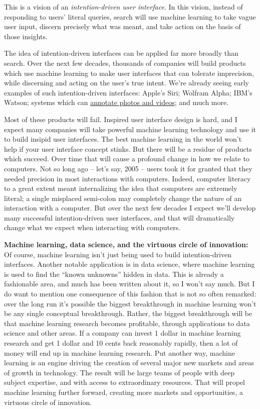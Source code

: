 \documentclass[a4paper,twoside,10pt]{book}
\begin{document}
This is a vision of an \textit{intention-driven user interface}. In this vision, instead of responding to users' literal queries, search will use machine learning to take vague user input, discern precisely what was meant, and take action on the basis of those insights.

The idea of intention-driven interfaces can be applied far more broadly than search. Over the next few decades, thousands of companies will build products which use machine learning to make user interfaces that can tolerate imprecision, while discerning and acting on the user's true intent. We're already seeing early examples of such intention-driven interfaces: Apple's Siri; Wolfram Alpha; IBM's Watson; systems which can \href{http://arxiv.org/abs/1411.4555}{annotate photos and videos}; and much more.

Most of these products will fail. Inspired user interface design is hard, and I expect many companies will take powerful machine learning technology and use it to build insipid user interfaces. The best machine learning in the world won't help if your user interface concept stinks. But there will be a residue of products which succeed. Over time that will cause a profound change in how we relate to computers. Not so long ago -- let's say, 2005 -- users took it for granted that they needed precision in most interactions with computers. Indeed, computer literacy to a great extent meant internalizing the idea that computers are extremely literal; a single misplaced semi-colon may completely change the nature of an interaction with a computer. But over the next few decades I expect we'll develop many successful intention-driven user interfaces, and that will dramatically change what we expect when interacting with computers.

\textbf{Machine learning, data science, and the virtuous circle of innovation:} Of course, machine learning isn't just being used to build intention-driven interfaces. Another notable application is in data science, where machine learning is used to find the ``known unknowns'' hidden in data. This is already a fashionable area, and much has been written about it, so I won't say much. But I do want to mention one consequence of this fashion that is not so often remarked: over the long run it's possible the biggest breakthrough in machine learning won't be any single conceptual breakthrough. Rather, the biggest breakthrough will be that machine learning research becomes profitable, through applications to data science and other areas. If a company can invest 1 dollar in machine learning research and get 1 dollar and 10 cents back reasonably rapidly, then a lot of money will end up in machine learning research. Put another way, machine learning is an engine driving the creation of several major new markets and areas of growth in technology. The result will be large teams of people with deep subject expertise, and with access to extraordinary resources. That will propel machine learning further forward, creating more markets and opportunities, a virtuous circle of innovation.
\end{document}

